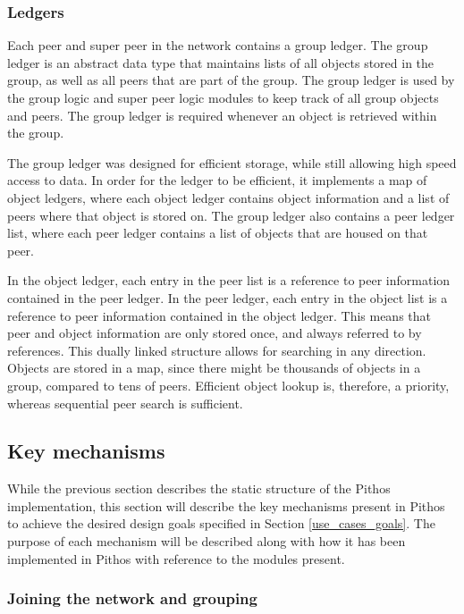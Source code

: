 \subsubsection{Ledgers}
\label{pithos_module_types_ledgers}

Each peer and super peer in the network contains a group ledger. The group ledger is an abstract data type that maintains lists of all objects stored in the group, as well as all peers that are part of the group. The group ledger is used by the group logic and super peer logic modules to keep track of all group objects and peers. The group ledger is required whenever an object is retrieved within the group.

The group ledger was designed for efficient storage, while still allowing high speed access to data. In order for the ledger to be efficient, it implements a map of object ledgers, where each object ledger contains object information and a list of peers where that object is stored on. The group ledger also contains a peer ledger list, where each peer ledger contains a list of objects that are housed on that peer.

In the object ledger, each entry in the peer list is a reference to peer information contained in the peer ledger. In the peer ledger, each entry in the object list is a reference to peer information contained in the object ledger. This means that peer and object information are only stored once, and always referred to by references. This dually linked structure allows for searching in any direction. Objects are stored in a map, since there might be thousands of objects in a group, compared to tens of peers. Efficient object lookup is, therefore, a priority, whereas sequential peer search is sufficient.

\subsection{Key mechanisms}

While the previous section describes the static structure of the Pithos implementation, this section will describe the key mechanisms present in Pithos to achieve the desired design goals specified in Section \ref{use_cases_goals}. The purpose of each mechanism will be described along with how it has been implemented in Pithos with reference to the modules present.

    \subsubsection{Joining the network and grouping}
    \label{network_join_implementation}

